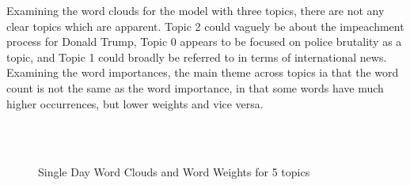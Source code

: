 Examining the word clouds for the model with three topics, there are not any clear topics which are apparent. Topic 2 could vaguely be about the impeachment process for Donald Trump, Topic 0 appears to be focused on police brutality as a topic, and Topic 1 could broadly be referred to in terms of international news. Examining the word importances, the main theme across topics ia that the word count is not the same as the word importance, in that some words have much higher occurrences, but lower weights and vice versa.

\begin{figure}[H]
	\centering
	\\
	\\
	
	\caption{Single Day Word Clouds and Word Weights for 5 topics}
	\label{fig:single5}
\end{figure}	

